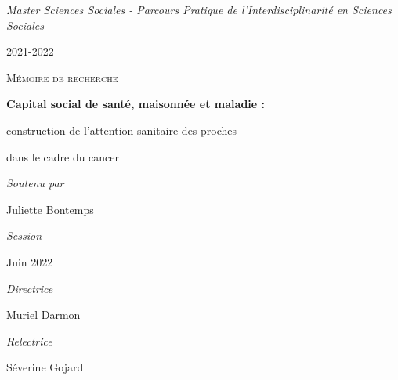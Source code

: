\documentclass[
  12pt,
]{article}
\author{}
\date{\vspace{-2.5em}}
\begin{document}
\begin{titlepage}

\par
{}
\hfill
{}
\par

\vspace{1cm}
\begin{center}

\textit{Master Sciences Sociales - Parcours Pratique de l'Interdisciplinarité en Sciences Sociales}

2021-2022

\vspace{5mm}

\textsc{Mémoire de recherche}

\vfill 

{\LARGE\bfseries Capital social de santé, maisonnée et maladie : \par}

{\Large construction de l’attention sanitaire des proches \par}

{\Large dans le cadre du cancer\par}

\vfill

{\large\itshape Soutenu par}

{\large Juliette Bontemps}

\vspace{5mm}

\textit{Session}

Juin 2022

\vspace{5mm}

\textit{Directrice}

Muriel Darmon

\vspace{5mm}

\textit{Relectrice}

Séverine Gojard

\end{center}
\end{titlepage}
\newpage

{}
\end{document}
